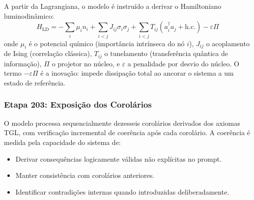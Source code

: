 \documentclass[12pt,a4paper]{article}
\newcommand{\Hld}{H_{\text{LD}}}
\begin{document}
A partir da Lagrangiana, o modelo é instruído a derivar o
Hamiltoniano luminodinâmico:
\begin{equation}
\Hld = -\sum_i \mu_i n_i
  + \sum_{i<j} J_{ij} \sigma_i \sigma_j
  + \sum_{i<j} T_{ij} (a_i^\dagger a_j + \text{h.c.})
  - \varepsilon\Pi
\label{eq:hamiltoniano}
\end{equation}
onde $\mu_i$ é o potencial químico (importância intrínseca do nó
$i$), $J_{ij}$ o acoplamento de Ising (correlação clássica),
$T_{ij}$ o tunelamento (transferência quântica de informação),
$\Pi$ o projetor no núcleo, e $\varepsilon$ a penalidade por
desvio do núcleo. O termo $-\varepsilon\Pi$ é a inovação: impede
dissipação total ao ancorar o sistema a um estado de referência.

\subsubsection{Etapa 203: Exposição dos Corolários}

O modelo processa sequencialmente dezesseis corolários derivados
dos axiomas TGL, com verificação incremental de coerência após cada
corolário. A coerência é medida pela capacidade do sistema de:
\begin{itemize}[leftmargin=*]
\item Derivar consequências logicamente válidas não explícitas no
prompt.
\item Manter consistência com corolários anteriores.
\item Identificar contradições internas quando introduzidas
deliberadamente.
\end{itemize}
\end{document}
